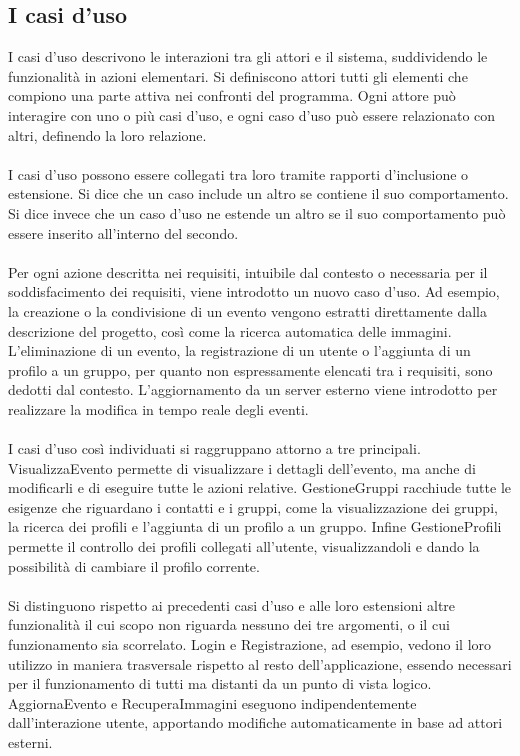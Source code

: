\subsection{I casi d’uso}

I casi d’uso descrivono le interazioni tra gli attori e il sistema, 
suddividendo le funzionalità in azioni elementari.
Si definiscono attori tutti gli elementi che compiono una parte attiva nei confronti del programma.
Ogni attore può interagire con uno o più casi d'uso,
e ogni caso d'uso può essere relazionato con altri, definendo la loro relazione.\\
\\
I casi d'uso possono essere collegati tra loro tramite rapporti d'inclusione o estensione.
Si dice che un caso include un altro se contiene il suo comportamento.
Si dice invece che un caso d'uso ne estende un altro se 
il suo comportamento può essere inserito all'interno del secondo.\\
\\
Per ogni azione descritta nei requisiti, intuibile dal contesto o necessaria per il soddisfacimento dei requisiti, 
viene introdotto un nuovo caso d'uso.
Ad esempio, la creazione o la condivisione di un evento 
vengono estratti direttamente dalla descrizione del progetto, 
così come la ricerca automatica delle immagini.
L'eliminazione di un evento, la registrazione di un utente o l'aggiunta di un profilo a un gruppo, 
per quanto non espressamente elencati tra i requisiti,
sono dedotti dal contesto.
L'aggiornamento da un server esterno viene introdotto 
per realizzare la modifica in tempo reale degli eventi.\\
\\
I casi d'uso così individuati si raggruppano attorno a tre principali.
VisualizzaEvento permette di visualizzare i dettagli dell'evento,
ma anche di modificarli e di eseguire tutte le azioni relative.
GestioneGruppi racchiude tutte le esigenze che riguardano i contatti e i gruppi, 
come la visualizzazione dei gruppi, la ricerca dei profili e l'aggiunta di un profilo a un gruppo.
Infine GestioneProfili permette il controllo dei profili collegati all'utente, 
visualizzandoli e dando la possibilità di cambiare il profilo corrente.\\
\\
Si distinguono rispetto ai precedenti casi d'uso e alle loro estensioni
altre funzionalità il cui scopo non riguarda nessuno dei tre argomenti, 
o il cui funzionamento sia scorrelato.
Login e Registrazione, ad esempio, 
vedono il loro utilizzo in maniera trasversale rispetto al resto dell'applicazione, 
essendo necessari per il funzionamento di tutti ma distanti da un punto di vista logico.
AggiornaEvento e RecuperaImmagini eseguono indipendentemente dall'interazione utente, 
apportando modifiche automaticamente in base ad attori esterni.\\

